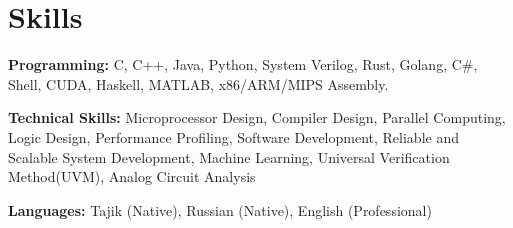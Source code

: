 \documentclass[letterpaper,11pt]{article}
\newcommand{\resumeSubHeadingListStart}{\begin{itemize}[leftmargin=0.15in, label={}]}
\newcommand{\resumeSubHeadingListEnd}{\end{itemize}}
\begin{document}
        
        
        




\section{Skills}
  \vspace{2pt}
  \resumeSubHeadingListStart
    \small{\item{
        \textbf{Programming:}{ C, C++, Java, Python, System Verilog, Rust, Golang, C\#, Shell, CUDA, Haskell, MATLAB, x86/ARM/MIPS Assembly.} \\ \vspace{3pt}
        
        \textbf{Technical Skills:}{ Microprocessor Design, Compiler Design, Parallel Computing, Logic Design, Performance Profiling, Software Development, Reliable and Scalable System Development, Machine Learning, Universal Verification Method(UVM), Analog Circuit Analysis} \\ \vspace{3pt}
        
        \textbf{Languages:}{ Tajik (Native), Russian (Native), English (Professional)}
        
    }}
  \resumeSubHeadingListEnd
\end{document}
